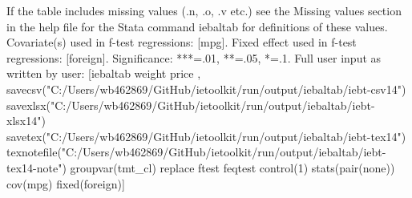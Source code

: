 If the table includes missing values (.n, .o, .v etc.) see the Missing values section in the help file for the Stata command iebaltab for definitions of these values. Covariate(s) used in f-test regressions: [mpg]. Fixed effect used in f-test regressions: [foreign]. Significance: ***=.01, **=.05, *=.1. Full user input as written by user: [iebaltab weight price , savecsv("C:/Users/wb462869/GitHub/ietoolkit/run/output/iebaltab/iebt-csv14") savexlsx("C:/Users/wb462869/GitHub/ietoolkit/run/output/iebaltab/iebt-xlsx14") savetex("C:/Users/wb462869/GitHub/ietoolkit/run/output/iebaltab/iebt-tex14") texnotefile("C:/Users/wb462869/GitHub/ietoolkit/run/output/iebaltab/iebt-tex14-note") groupvar(tmt\_cl) replace ftest feqtest control(1) stats(pair(none)) cov(mpg) fixed(foreign)]
